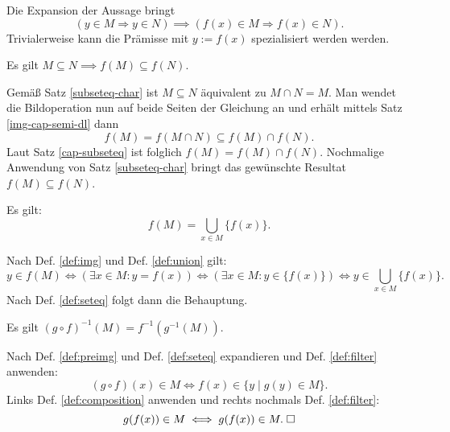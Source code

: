 \begin{Beweis}[Beweis\;2]
Die Expansion der Aussage bringt
\[(y\in M\Rightarrow y\in N)\implies (f(x)\in M\Rightarrow f(x)\in N).\]
Trivialerweise kann die Prämisse mit $y:=f(x)$ spezialisiert
werden werden.\;\qedsymbol
\end{Beweis}

\begin{Satz}\label{img-subseteq}
Es gilt $M\subseteq N\implies f(M)\subseteq f(N)$.
\end{Satz}
\begin{Beweis}
Gemäß Satz \ref{subseteq-char} ist $M\subseteq N$ äquivalent zu
$M\cap N=M$. Man wendet die Bildoperation nun auf beide Seiten
der Gleichung an und erhält mittels Satz \ref{img-cap-semi-dl}
dann%
\[f(M) = f(M\cap N)\subseteq f(M)\cap f(N).\]
Laut Satz \ref{cap-subseteq} ist folglich $f(M)=f(M)\cap f(N)$.
Nochmalige Anwendung von Satz \ref{subseteq-char} bringt das
gewünschte Resultat $f(M)\subseteq f(N)$.\;\qedsymbol
\end{Beweis}

\begin{Satz}\label{img-as-cup}
Es gilt:
\[f(M) = \bigcup_{x\in M} \{f(x)\}.\]
\end{Satz}

\begin{Beweis}
Nach Def. \ref{def:img} und Def. \ref{def:union} gilt:
\[y\in f(M) \iff (\exists x{\in}M\colon y=f(x))
\iff (\exists x{\in}M\colon y\in \{f(x)\})
\iff y\in\bigcup_{x\in M}\{f(x)\}.\]
Nach Def. \ref{def:seteq} folgt dann die Behauptung.\,\qedsymbol
\end{Beweis}

\begin{Satz}\label{preimg-chain}
Es gilt $(g\circ f)^{-1}(M) = f^{-1}(g^{-1}(M))$.
\end{Satz}
\begin{Beweis}
Nach Def. \ref{def:preimg} und Def. \ref{def:seteq}
expandieren und Def. \ref{def:filter} anwenden:%
\[(g\circ f)(x)\in M \iff f(x)\in\{y\mid g(y)\in M\}.\]
Links Def. \ref{def:composition} anwenden und rechts
nochmals Def. \ref{def:filter}:%
\[g(f(x))\in M \iff g(f(x))\in M.\;\square\]
\end{Beweis}


